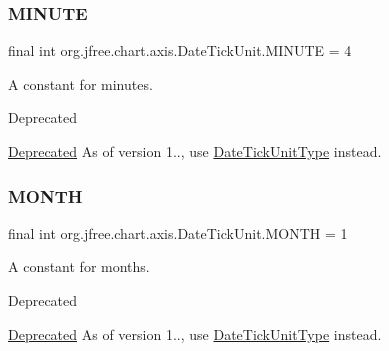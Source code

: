 \subsubsection{\texorpdfstring{M\+I\+N\+U\+TE}{MINUTE}}
{\footnotesize\ttfamily final int org.\+jfree.\+chart.\+axis.\+Date\+Tick\+Unit.\+M\+I\+N\+U\+TE = 4\hspace{0.3cm}{\ttfamily [static]}}

A constant for minutes.

\begin{DoxyRefDesc}{Deprecated}
\item[\mbox{\hyperlink{deprecated__deprecated000010}{Deprecated}}]As of version 1.., use \mbox{\hyperlink{classorg_1_1jfree_1_1chart_1_1axis_1_1_date_tick_unit_type}{Date\+Tick\+Unit\+Type}} instead. \end{DoxyRefDesc}
\mbox{\label{classorg_1_1jfree_1_1chart_1_1axis_1_1_date_tick_unit_aa0906361a1b228d9d74f03b85c630e23}} 
\subsubsection{\texorpdfstring{M\+O\+N\+TH}{MONTH}}
{\footnotesize\ttfamily final int org.\+jfree.\+chart.\+axis.\+Date\+Tick\+Unit.\+M\+O\+N\+TH = 1\hspace{0.3cm}{\ttfamily [static]}}

A constant for months.

\begin{DoxyRefDesc}{Deprecated}
\item[\mbox{\hyperlink{deprecated__deprecated000007}{Deprecated}}]As of version 1.., use \mbox{\hyperlink{classorg_1_1jfree_1_1chart_1_1axis_1_1_date_tick_unit_type}{Date\+Tick\+Unit\+Type}} instead. \end{DoxyRefDesc}
\mbox{\label{classorg_1_1jfree_1_1chart_1_1axis_1_1_date_tick_unit_a84b9c370c562909c7320e928c4251749}} 
